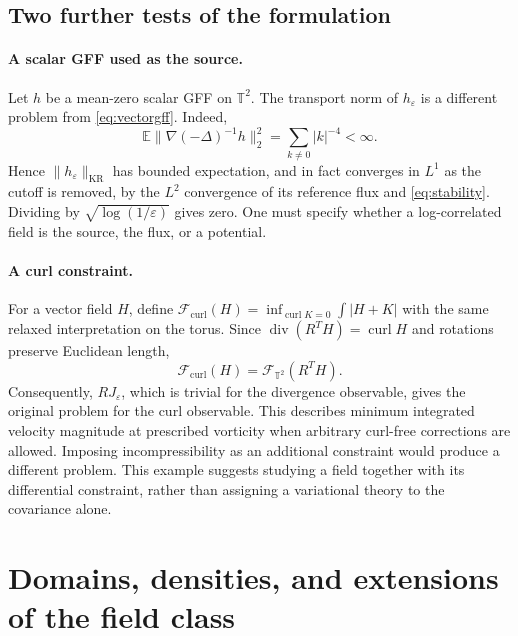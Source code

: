 \documentclass[11pt]{article}
\theoremstyle{definition}
\newcommand{\E}{\mathbb E}
\newcommand{\T}{\mathbb T}
\newcommand{\diver}{\operatorname{div}}
\newcommand{\curl}{\operatorname{curl}}
\newcommand{\KR}{\mathrm{KR}}
\newcommand{\cF}{\mathcal F}
\begin{document}
\subsection{Two further tests of the formulation}
\paragraph{A scalar GFF used as the source.}
Let $h$ be a mean-zero scalar GFF on $\T^2$. The transport norm of
$h_\varepsilon$ is a different problem from
\eqref{eq:vectorgff}. Indeed,
\[
  \E\|\nabla(-\Delta)^{-1}h\|_2^2
  =\sum_{k\ne0}|k|^{-4}<\infty.
\]
Hence $\|h_\varepsilon\|_{\KR}$ has bounded expectation, and in fact
converges in $L^1$ as the cutoff is removed, by the $L^2$ convergence of
its reference flux and \eqref{eq:stability}. Dividing by
$\sqrt{\log(1/\varepsilon)}$ gives zero. One must specify whether a
log-correlated field is the source, the flux, or a potential.

\paragraph{A curl constraint.}
For a vector field $H$, define
$\cF_{\curl}(H)=\inf_{\curl K=0}\int|H+K|$ with the same relaxed
interpretation on the torus. Since $\diver(R^TH)=\curl H$ and rotations
preserve Euclidean length,
\[
  \cF_{\curl}(H)=\cF_{\T^2}(R^TH).
\]
Consequently, $RJ_\varepsilon$, which is trivial for the divergence
observable, gives the original problem for the curl observable. This
describes minimum integrated velocity magnitude at prescribed vorticity
when arbitrary curl-free corrections are allowed. Imposing
incompressibility as an additional constraint would produce a different
problem. This example suggests studying a field together with its
differential constraint, rather than assigning a variational theory to
the covariance alone.

\section{Domains, densities, and extensions of the field class}
\label{sec:extensions}
\end{document}
